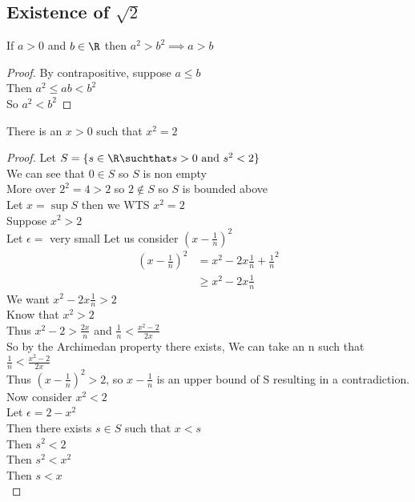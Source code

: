 \documentclass[answers,12pt,addpoints]{exam}
\begin{document}
\subsection{Existence of $\sqrt{2}$}
\begin{lemma}
    If $a >0$ and $b \in \R$ then $a^2 > b^2 \implies a > b$
    \begin{proof}
        By contrapositive, suppose $a \leq b$ \\
        Then $a^2 \leq ab < b^2$ \\
        So $a^2 < b^2$
    \end{proof}
\end{lemma}
\begin{theorem}
    There is an $x >0$ such that $x^2 = 2$
    \begin{proof}
        Let $S = \{s \in \R \suchthat s > 0 \text{ and } s^2 < 2\}$ \\
        We can see that $0 \in S$ so $S$ is non empty \\
        More over $2^2 = 4 > 2$ so $2 \notin S$ so $S$ is bounded above \\
        Let $x = \sup S$ then we WTS $x^2 = 2$ \\
        Suppose $x^2 > 2$ \\
        Let $\epsilon=$ very small
        Let us consider $(x-\frac{1}{n})^2$ \\
        \begin{align*}
            (x-\frac{1}{n})^2 &= x^2 - 2x\frac{1}{n} + \frac{1}{n}^2\\
            &\geq x^2 - 2x\frac{1}{n}
        \end{align*}
        We want $x^2 - 2x\frac{1}{n} > 2$ \\
        Know that $x^2 > 2$ \\
        Thus $x^2 - 2 > \frac{2x}{n}$ and $\frac{1}{n} < \frac{x^2-2}{2x}$\\
        So by the Archimedan property there exists, We can take an n such that $\frac{1}{n} < \frac{x^2-2}{2x}$ \\
        Thus $(x-\frac{1}{n})^2 > 2$, so $x-\frac{1}{n}$ is an upper bound of S resulting in a contradiction.\\
        Now consider $x^2 < 2$ \\
        Let $\epsilon = 2-x^2$ \\
        Then there exists $s \in S$ such that $x < s$ \\
        Then $s^2 < 2$ \\
        Then $s^2 < x^2$ \\
        Then $s < x$ \\
    \end{proof}
\end{theorem}
\end{document}
